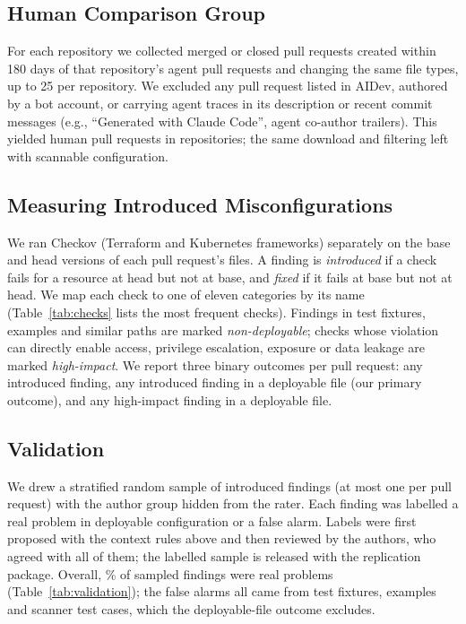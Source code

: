 \documentclass[10pt,conference]{IEEEtran}
\begin{document}
\subsection{Human Comparison Group}
For each repository we collected merged or closed pull requests created within 180 days of that repository's agent pull requests and changing the same file types, up to 25 per repository. We excluded any pull request listed in AIDev, authored by a bot account, or carrying agent traces in its description or recent commit messages (e.g., ``Generated with Claude Code'', agent co-author trailers). This yielded \NhumanCollected{} human pull requests in \NhumanRepos{} repositories; the same download and filtering left \NhumanAll{} with scannable configuration.

\subsection{Measuring Introduced Misconfigurations}
We ran Checkov (Terraform and Kubernetes frameworks) separately on the base and head versions of each pull request's files. A finding is \emph{introduced} if a check fails for a resource at head but not at base, and \emph{fixed} if it fails at base but not at head. We map each check to one of eleven categories by its name (Table~\ref{tab:checks} lists the most frequent checks). Findings in test fixtures, examples and similar paths are marked \emph{non-deployable}; checks whose violation can directly enable access, privilege escalation, exposure or data leakage are marked \emph{high-impact}. We report three binary outcomes per pull request: any introduced finding, any introduced finding in a deployable file (our primary outcome), and any high-impact finding in a deployable file.

\subsection{Validation}\label{sec:validation}
We drew a stratified random sample of \ValN{} introduced findings (at most one per pull request) with the author group hidden from the rater. Each finding was labelled a real problem in deployable configuration or a false alarm. Labels were first proposed with the context rules above and then reviewed by the authors, who agreed with all of them; the labelled sample is released with the replication package. Overall, \ValPrec\% of sampled findings were real problems (Table~\ref{tab:validation}); the \ValFPtest{} false alarms all came from test fixtures, examples and scanner test cases, which the deployable-file outcome excludes.
\end{document}
